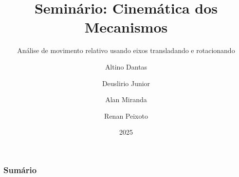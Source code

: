 
\title[UFPA]{Seminário: Cinemática dos Mecanismos}
\subtitle{Análise de movimento relativo usando eixos transladando e rotacionando}

\author{
    Altino Dantas\and
    Deuslirio Junior\and
    Alan Miranda\and
    Renan Peixoto
}

\date{2025}
\frame[noframenumbering]{\titlepage}



\begin{frame}
    \frametitle{Sumário}
    \tableofcontents
\end{frame}
